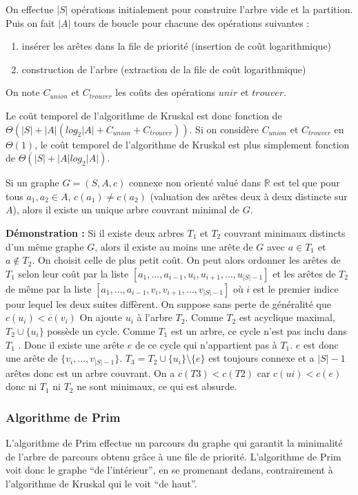 \documentclass[../../../main.tex]{subfiles}
\begin{document}
On effectue $|S|$ opérations initialement pour construire l'arbre vide et la partition. Puis on fait $|A|$
tours de boucle pour chacune des opérations suivantes :
\begin{enumerate}
	\item insérer les arêtes dans la file de priorité (insertion de coût logarithmique)
	\item construction de l'arbre (extraction de la file de coût logarithmique)
\end{enumerate}
On note $C_{union}$ et $C_{trouver}$ les coûts des opérations $unir$ et $trouver$.

Le coût temporel de l'algorithme de Kruskal est donc fonction de $\Theta(|S|+|A|(log_2|A| + C_{union} + C_{trouver}))$.
Si on considère $C_{union}$ et $C_{trouver}$ en $\Theta(1)$, le coût temporel de l'algorithme de Kruskal est plus
simplement fonction de $\Theta(|S| + |A|log_2|A|)$.

 Si un graphe $G = (S, A, c)$ connexe non
orienté valué dans $\mathbb{R}$ est tel que pour tous $a_1 , a_2\in A$, $c(a_1)\neq c(a_2)$ (valuation des arêtes deux à deux
distincte sur $A$), alors il existe un unique arbre couvrant minimal de $G$.

\textbf{Démonstration :} Si il existe deux arbres $T_1$ et $T_2$ couvrant minimaux distincts d'un même graphe
$G$, alors il existe au moins une arête de $G$ avec $a\in T_1$ et $a\notin T_2$. On choisit celle de plus petit coût.
On peut alors ordonner les arêtes de $T_1$ selon leur coût par la liste $[a_1, \dots , a_{i-1} , u_i , u_{i+1} , \dots , u_{|S|-1} ]$ et
les arêtes de $T_2$ de même par la liste $[a_1 , \dots , a_{i-1} , v_i , v_{i+1} ,\dots, v_{|S|-1} ]$ où $i$ est le premier indice pour
lequel les deux suites diffèrent. On suppose sans perte de généralité que $c(u_i ) < c(v_i )$ On ajoute $u_i$ à
l'arbre $T_2$. Comme $T_2$ est acyclique maximal, $T_2\cup\{u_i\}$ possède un cycle. Comme $T_1$ est un arbre, ce
cycle n'est pas inclu dans $T_1$ . Donc il existe une arête $e$ de ce cycle qui n'appartient pas à $T_1$. $e$ est
donc une arête de $\{v_i ,\dots , v_{|S|-1}\}$. $T_3 = T_2 \cup \{u_i \} \setminus\{e\}$ est toujours connexe et a $|S| - 1$ arêtes donc
est un arbre couvrant. On a $c(T3 ) < c(T2 )$ car $c(ui ) < c(e)$ donc ni $T_1$ ni $T_2$ ne sont minimaux, ce qui
est absurde.
\subsubsection{Algorithme de Prim}
L'algorithme de Prim effectue un parcours du graphe qui garantit la minimalité de l'arbre de parcours
obtenu grâce à une file de priorité. L'algorithme de Prim voit donc le graphe ``de l'intérieur'', en se
promenant dedans, contrairement à l'algorithme de Kruskal qui le voit ``de haut''.
\end{document}
